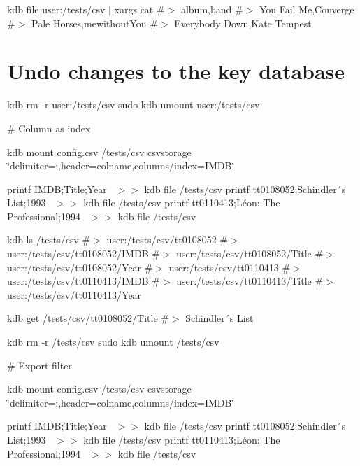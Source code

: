 kdb file user\+:/tests/csv $\vert$ xargs cat \#$>$ album,band \#$>$ You Fail Me,Converge \#$>$ Pale Horses,mewithout\+You \#$>$ Everybody Down,Kate Tempest\hypertarget{autotoc_md123_autotoc_md138}{}\section{Undo changes to the key database}\label{autotoc_md123_autotoc_md138}
kdb rm -\/r user\+:/tests/csv sudo kdb umount user\+:/tests/csv 
\begin{DoxyCode}
# Column as index
\end{DoxyCode}
 kdb mount config.\+csv /tests/csv csvstorage \char`\"{}delimiter=;,header=colname,columns/index=\+I\+M\+D\+B\char`\"{}

printf \textquotesingle{}I\+M\+DB;Title;Year~\newline
\textquotesingle{} $>$$>$ {\ttfamily kdb file /tests/csv} printf \textquotesingle{}tt0108052;Schindler´s List;1993~\newline
\textquotesingle{} $>$$>$ {\ttfamily kdb file /tests/csv} printf \textquotesingle{}tt0110413;Léon\+: The Professional;1994~\newline
\textquotesingle{} $>$$>$ {\ttfamily kdb file /tests/csv}

kdb ls /tests/csv \#$>$ user\+:/tests/csv/tt0108052 \#$>$ user\+:/tests/csv/tt0108052/\+I\+M\+DB \#$>$ user\+:/tests/csv/tt0108052/\+Title \#$>$ user\+:/tests/csv/tt0108052/\+Year \#$>$ user\+:/tests/csv/tt0110413 \#$>$ user\+:/tests/csv/tt0110413/\+I\+M\+DB \#$>$ user\+:/tests/csv/tt0110413/\+Title \#$>$ user\+:/tests/csv/tt0110413/\+Year

kdb get /tests/csv/tt0108052/\+Title \#$>$ Schindler´s List

kdb rm -\/r /tests/csv sudo kdb umount /tests/csv


\begin{DoxyCode}
# Export filter
\end{DoxyCode}
 kdb mount config.\+csv /tests/csv csvstorage \char`\"{}delimiter=;,header=colname,columns/index=\+I\+M\+D\+B\char`\"{}

printf \textquotesingle{}I\+M\+DB;Title;Year~\newline
\textquotesingle{} $>$$>$ {\ttfamily kdb file /tests/csv} printf \textquotesingle{}tt0108052;Schindler´s List;1993~\newline
\textquotesingle{} $>$$>$ {\ttfamily kdb file /tests/csv} printf \textquotesingle{}tt0110413;Léon\+: The Professional;1994~\newline
\textquotesingle{} $>$$>$ {\ttfamily kdb file /tests/csv}

